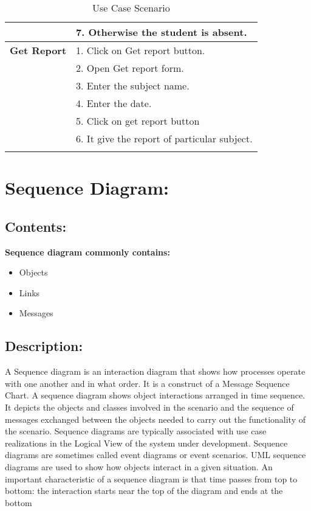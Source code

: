 \begin{center}
\begin{longtable}{|p{5cm}|p{9cm}|}
& 7.  Otherwise the student is absent.\\\hline
\textbf{Get Report} & 1. Click on Get report button.\\
& 2. Open Get report form.\\
& 3.  Enter the subject name.\\
& 4. Enter the date.\\
& 5.  Click on get report button\\
& 6.  It give the report of particular subject.\\\hline
\caption{Use Case Scenario}
 \label{tab:addlabel}%
\end{longtable}
\end{center}
	
\section{Sequence Diagram: }
\subsection{Contents: }
{\bfseries Sequence diagram commonly contains: }
\begin{itemize}
\item Objects 
\item Links
\item Messages
\end {itemize}

\subsection{Description:}
A Sequence diagram is an interaction diagram that shows how processes operate with one another and in what order. It is a construct of a Message Sequence Chart. A sequence diagram shows object interactions arranged in time sequence. It depicts the objects and classes involved in the scenario and the sequence of messages exchanged between the objects needed to carry out the functionality of the scenario. Sequence diagrams are typically associated with use case realizations in the Logical View of the system under development. Sequence diagrams are sometimes called event diagrams or event scenarios.\cite{priti}
UML sequence diagrams are used to show how objects interact in a given situation. An important characteristic of a sequence diagram is that time passes from top to bottom: the interaction starts near the top of the diagram and ends at the bottom 

